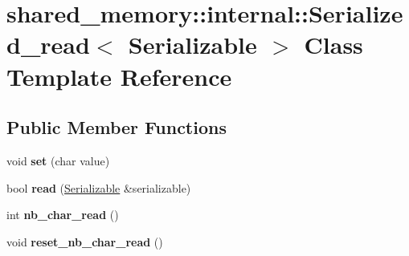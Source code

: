 \hypertarget{classshared__memory_1_1internal_1_1Serialized__read}{}\section{shared\+\_\+memory\+:\+:internal\+:\+:Serialized\+\_\+read$<$ Serializable $>$ Class Template Reference}
\label{classshared__memory_1_1internal_1_1Serialized__read}
\subsection*{Public Member Functions}
\begin{DoxyCompactItemize}
\item 
\mbox{\label{classshared__memory_1_1internal_1_1Serialized__read_ab13f4c5e450bc206ca5f30baa43ed5f6}} 
void {\bfseries set} (char value)
\item 
\mbox{\label{classshared__memory_1_1internal_1_1Serialized__read_add7a39a632e0f6868e60109ad58fa3a2}} 
bool {\bfseries read} (\hyperlink{classSerializable}{Serializable} \&serializable)
\item 
\mbox{\label{classshared__memory_1_1internal_1_1Serialized__read_a7267b8b68f925787f37fa9c0e369a93b}} 
int {\bfseries nb\+\_\+char\+\_\+read} ()
\item 
\mbox{\label{classshared__memory_1_1internal_1_1Serialized__read_a664a3d89efb0f985578b3fb4835f97d4}} 
void {\bfseries reset\+\_\+nb\+\_\+char\+\_\+read} ()
\end{DoxyCompactItemize}
